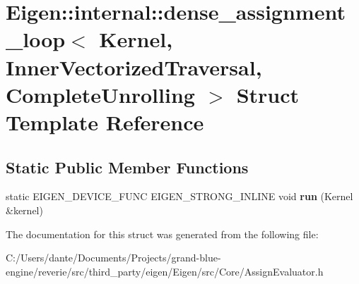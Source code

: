 \hypertarget{struct_eigen_1_1internal_1_1dense__assignment__loop_3_01_kernel_00_01_inner_vectorized_traversal_00_01_complete_unrolling_01_4}{}\section{Eigen\+::internal\+::dense\+\_\+assignment\+\_\+loop$<$ Kernel, Inner\+Vectorized\+Traversal, Complete\+Unrolling $>$ Struct Template Reference}
\label{struct_eigen_1_1internal_1_1dense__assignment__loop_3_01_kernel_00_01_inner_vectorized_traversal_00_01_complete_unrolling_01_4}
\subsection*{Static Public Member Functions}
\begin{DoxyCompactItemize}
\item 
\mbox{\label{struct_eigen_1_1internal_1_1dense__assignment__loop_3_01_kernel_00_01_inner_vectorized_traversal_00_01_complete_unrolling_01_4_a903c9b84389dcdb758dd8dcc7e742283}} 
static E\+I\+G\+E\+N\+\_\+\+D\+E\+V\+I\+C\+E\+\_\+\+F\+U\+NC E\+I\+G\+E\+N\+\_\+\+S\+T\+R\+O\+N\+G\+\_\+\+I\+N\+L\+I\+NE void {\bfseries run} (Kernel \&kernel)
\end{DoxyCompactItemize}


The documentation for this struct was generated from the following file\+:\begin{DoxyCompactItemize}
\item 
C\+:/\+Users/dante/\+Documents/\+Projects/grand-\/blue-\/engine/reverie/src/third\+\_\+party/eigen/\+Eigen/src/\+Core/Assign\+Evaluator.\+h\end{DoxyCompactItemize}
